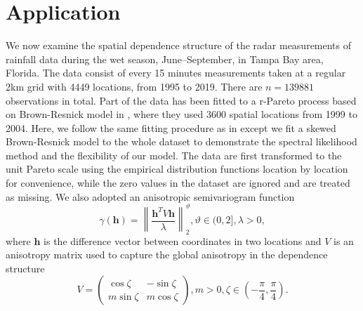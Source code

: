 \documentclass[12pt]{article}
\begin{document}
\section{Application}
\label{sec:application}
We now examine the spatial dependence structure of the radar measurements of rainfall data during the wet season, June--September, in Tampa Bay area, Florida. The data consist of every 15 minutes measurements taken at a regular 2km grid with 4449 locations, from 1995 to 2019. There are $n=139881$ observations in total. Part of the data has been fitted to a r-Pareto process based on Brown-Resnick model in \cite{deFondeville.Davison:2018}, where they used 3600 spatial locations from 1999 to 2004. Here, we follow the same fitting procedure as in \citet{deFondeville.Davison:2018} except we fit a skewed Brown-Resnick model to the whole dataset to demonstrate the spectral likelihood method and the flexibility of our model. The data are first transformed to the unit Pareto scale using the empirical distribution functions location by location for convenience, while the zero values in the dataset are ignored and are treated as missing. We also adopted an anisotropic semivariogram function 
\begin{equation}
    \gamma(\bm h) = \left\|\frac{\bm h^T V \bm h}{\lambda}\right\|_2^\vartheta, \vartheta\in(0,2],\lambda>0,
\end{equation}
where $\bm h$ is the difference vector between coordinates in two locations and $V$ is an anisotropy matrix used to capture the global anisotropy in the dependence structure
\begin{equation}
    V = \begin{pmatrix}
    \cos\zeta & - \sin\zeta\\
    m\sin\zeta &  m\cos\zeta
    \end{pmatrix}, m >0 , \zeta\in (-\frac{\pi}{4},\frac{\pi}{4}).
\end{equation}
\end{document}
